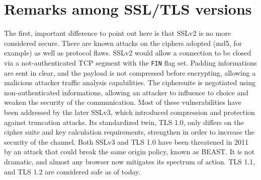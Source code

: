 \section{Remarks among SSL/TLS versions}

The first, important difference to point out here is that SSLv2 is no more
considered secure. There are known attacks on the ciphers adopted (md5, for
example) as well as protocol flaws.
SSLv2 would allow a connection to be closed via a not-authenticated TCP segment
with the \texttt{FIN} flag set. Padding informations are sent in clear, and the
payload is not compressed before encrypting, allowing a malicious attacker
traffic analysis capabilities. The ciphersuite is negotiated using
non-authenticated informations, allowing an attacker to influence to choice and
weaken the security of the communication.
Most of these vulnerabilities have been addressed by the later SSLv3, which
introduced compression and protection against truncation attacks.
Its standardized twin, TLS 1.0, only differs on the cipher suite and key
calculation requirements, strengthen in order to increase the security of the
channel.
Both SSLv3 and TLS 1.0 have been threatened in 2011 by an attack that could break
the same origin policy, known as BEAST. It is not dramatic, and almost any
browser now mitigates its spectrum of action.
TLS 1.1, and TLS 1.2 are considered safe as of today.
